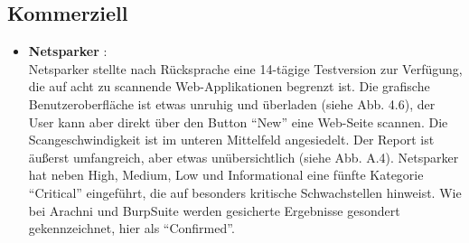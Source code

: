 \documentclass[12pt,oneside,a4paper,parskip,pointlessnumbers]{scrbook}
\begin{document}
    \subsection{Kommerziell}
      \begin{itemize}
        \item \textbf{Netsparker} \cite{Netsparker}:\\
          Netsparker stellte nach Rücksprache eine 14-tägige Testversion zur Verfügung, die auf acht zu scannende Web-Applikationen begrenzt ist. Die grafische Benutzeroberfläche ist etwas unruhig und überladen (siehe Abb. 4.6), der User kann aber direkt über den Button ``New'' eine Web-Seite scannen. Die Scangeschwindigkeit ist im unteren Mittelfeld angesiedelt. Der Report ist äußerst umfangreich, aber etwas unübersichtlich (siehe Abb. A.4). Netsparker hat neben High, Medium, Low und Informational eine fünfte Kategorie ``Critical'' eingeführt, die auf besonders kritische Schwachstellen hinweist. Wie bei Arachni und BurpSuite werden gesicherte Ergebnisse gesondert gekennzeichnet, hier als ``Confirmed''.


\end{itemize}
\end{document}
